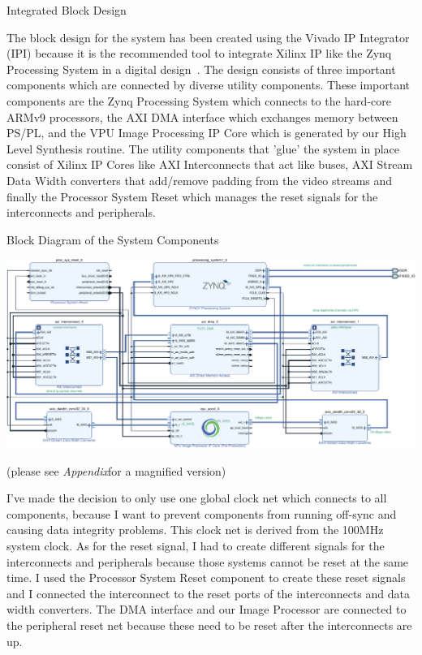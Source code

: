\documentclass{matthijs}
\begin{document}
	\begin{hoofdstuk}{Integrated Block Design}

		The block design for the system has been created using the Vivado IP Integrator (IPI) because it is the recommended tool to integrate Xilinx IP like the Zynq Processing System in a digital design~\cite{xilinxug994}.
		The design consists of three important components which are connected by diverse utility components.
		These important components are the Zynq Processing System which connects to the hard-core ARMv9 processors, the AXI DMA interface which exchanges memory between PS/PL, and the VPU Image Processing IP Core which is generated by our High Level Synthesis routine.
		The utility components that 'glue' the system in place consist of Xilinx IP Cores like AXI Interconnects that act like buses, AXI Stream Data Width converters that add/remove padding from the video streams and finally the Processor System Reset which manages the reset signals for the interconnects and peripherals.
		\begin{figuur}{Block Diagram of the System Components}
			
			\vspace{1cm}
			\centerline{\includegraphics[width=1.2\textwidth]{hw-block-diagram-crop-asset.pdf}}
			\vspace{0.5cm}
			(please see \textit{Appendix}for a magnified version)

		\end{figuur}

		I've made the decision to only use one global clock net which connects to all components, because I want to prevent components from running off-sync and causing data integrity problems.
		This clock net is derived from the 100MHz system clock.
		As for the reset signal, I had to create different signals for the interconnects and peripherals because those systems cannot be reset at the same time.
		I used the Processor System Reset component to create these reset signals and I connected the interconnect to the reset ports of the interconnects and data width converters.
		The DMA interface and our Image Processor are connected to the peripheral reset net because these need to be reset after the interconnects are up.


\end{hoofdstuk}
\end{document}
